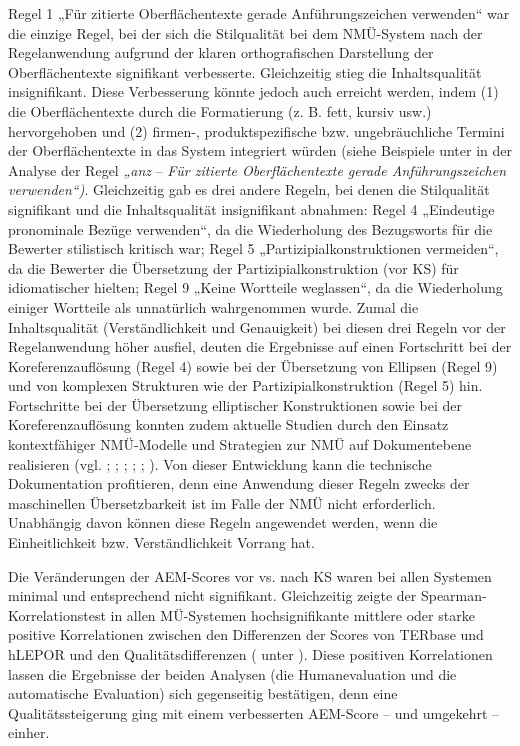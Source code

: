 Regel 1 „Für zitierte Oberflächentexte gerade Anführungszeichen verwenden“ war die einzige Regel, bei der sich die Stilqualität bei dem NMÜ-System nach der Regelanwendung aufgrund der klaren orthografischen Darstellung der Oberflächentexte signifikant verbesserte. Gleichzeitig stieg die Inhaltsqualität insignifikant. Diese Verbesserung könnte jedoch auch erreicht werden, indem (1) die Oberflächentexte durch die Formatierung (z. B. fett, kursiv usw.) hervorgehoben und (2) firmen-, produktspezifische bzw. ungebräuchliche Termini der Oberflächentexte in das System integriert würden (siehe Beispiele unter  in der Analyse der Regel \textit{„anz} -- \textit{Für zitierte Oberflächentexte gerade Anführungszeichen verwenden“)}. Gleichzeitig gab es drei andere Regeln, bei denen die Stilqualität signifikant und die Inhaltsqualität insignifikant abnahmen: Regel 4 „Eindeutige pronominale Bezüge verwenden“, da die Wiederholung des Bezugsworts für die Bewerter stilistisch kritisch war; Regel 5 „Partizipialkonstruktionen vermeiden“, da die Bewerter die Übersetzung der Partizipialkonstruktion (vor KS) für idiomatischer hielten; Regel 9 „Keine Wortteile weglassen“, da die Wiederholung einiger Wortteile als unnatürlich wahrgenommen wurde. Zumal die Inhaltsqualität (Verständlichkeit und Genauigkeit) bei diesen drei Regeln vor der Regelanwendung höher ausfiel, deuten die Ergebnisse auf einen Fortschritt bei der Koreferenzauflösung (Regel 4) sowie bei der Übersetzung von Ellipsen (Regel 9) und von komplexen Strukturen wie der Partizipialkonstruktion (Regel 5) hin. Fortschritte bei der Übersetzung elliptischer Konstruktionen sowie bei der Koreferenzauflösung konnten zudem aktuelle Studien durch den Einsatz kontextfähiger NMÜ-Modelle und Strategien zur NMÜ auf Dokumentebene realisieren (vgl. \citealt{MüllerEtAl2018}; \citealt{StojanovskiFraser2018}; \citealt{VoitaEtAl2018}; \citealt{Matusov2019}; \citealt{StojanovskiFraser2019}; \citealt{VoitaEtAl2019}). Von dieser Entwicklung kann die technische Dokumentation profitieren, denn eine Anwendung dieser Regeln zwecks der maschinellen Übersetzbarkeit ist im Falle der NMÜ nicht erforderlich. Unabhängig davon können diese Regeln angewendet werden, wenn die Einheitlichkeit bzw. Verständlichkeit Vorrang hat.

Die Veränderungen der AEM-Scores vor vs. nach KS waren bei allen Systemen minimal und entsprechend nicht signifikant. Gleichzeitig zeigte der Spearman-Korrelationstest in allen MÜ-Systemen hochsignifikante mittlere oder starke positive Korrelationen zwischen den Differenzen der Scores von TERbase und hLEPOR und den Qualitätsdifferenzen ( unter ).  Diese positiven Korrelationen lassen die Ergebnisse der beiden Analysen (die Humanevaluation und die automatische Evaluation) sich gegenseitig bestätigen, denn eine Qualitätssteigerung ging mit einem verbesserten AEM-Score – und umgekehrt – einher.

